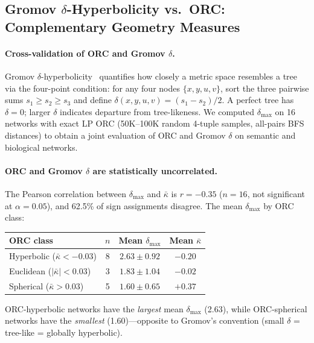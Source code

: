\documentclass[11pt,a4paper]{article}
\newcommand{\kbar}{\bar{\kappa}}
\begin{document}
\subsection{Gromov $\delta$-Hyperbolicity vs.\ ORC: Complementary Geometry Measures}
\label{sec:gromov}

\paragraph{Cross-validation of ORC and Gromov $\delta$.}
Gromov $\delta$-hyperbolicity~\cite{gromov1987hyperbolic} quantifies how closely a metric space resembles a tree via the four-point condition: for any four nodes $\{x,y,u,v\}$, sort the three pairwise sums $s_1 \geq s_2 \geq s_3$ and define $\delta(x,y,u,v) = (s_1 - s_2)/2$. A perfect tree has $\delta = 0$; larger $\delta$ indicates departure from tree-likeness. We computed $\delta_{\max}$ on 16 networks with exact LP ORC (50K--100K random 4-tuple samples, all-pairs BFS distances) to obtain a joint evaluation of ORC and Gromov $\delta$ on semantic and biological networks.

\paragraph{ORC and Gromov $\delta$ are statistically uncorrelated.}
The Pearson correlation between $\delta_{\max}$ and $\kbar$ is $r = -0.35$ ($n=16$, not significant at $\alpha=0.05$), and 62.5\% of sign assignments disagree. The mean $\delta_{\max}$ by ORC class:
\begin{center}
\small
\begin{tabular}{@{}lccc@{}}
\toprule
ORC class & $n$ & Mean $\delta_{\max}$ & Mean $\kbar$ \\
\midrule
Hyperbolic ($\kbar < -0.03$) & 8 & $2.63 \pm 0.92$ & $-0.20$ \\
Euclidean ($|\kbar| < 0.03$)  & 3 & $1.83 \pm 1.04$ & $-0.02$ \\
Spherical ($\kbar > 0.03$)    & 5 & $1.60 \pm 0.65$ & $+0.37$ \\
\bottomrule
\end{tabular}
\end{center}
ORC-hyperbolic networks have the \emph{largest} mean $\delta_{\max}$ (2.63), while ORC-spherical networks have the \emph{smallest} (1.60)---opposite to Gromov's convention (small $\delta$ = tree-like = globally hyperbolic).
\end{document}
